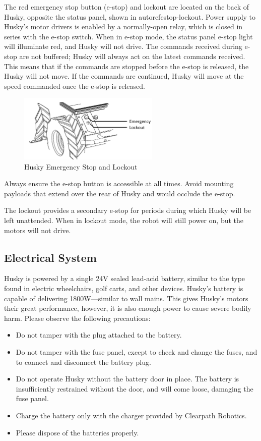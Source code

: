\documentclass[]{clearpath-latex/clearpath-manual}
\begin{document}
The red emergency stop button (e-stop) and lockout are located on the back of Husky, opposite the status panel, 
shown in autoref{estop-lockout}. Power supply to Husky’s motor drivers is enabled by a normally-open relay, 
which is closed in series with the e-stop switch. When in e-stop mode, the status panel e-stop light will illuminate red, 
and Husky will not drive. The commands received during e-stop are not buffered; Husky will always act on the latest commands 
received. This means that if the commands are stopped before the e-stop is released, the Husky will not move. If the 
commands are continued, Husky will move at the speed commanded once the e-stop is released.

\begin{figure}[h]
	\centering
	\includegraphics[width=0.6\textwidth]{estop-lockout.png}
	\caption{Husky Emergency Stop and Lockout}
	\label{estop-lockout}
\end{figure}

Always ensure the e-stop button is accessible at all times. Avoid mounting payloads that extend over the rear of Husky and would occlude the e-stop.

The lockout provides a secondary e-stop for periods during which Husky will be left unattended. When in lockout mode, the robot will still power on, but the motors will not drive.

\subsection{Electrical System}
Husky is powered by a single 24V sealed lead-acid battery, similar to the type found in electric wheelchairs, golf carts, 
and other devices. Husky’s battery is capable of delivering 1800W—similar to wall mains. This gives Husky’s motors their 
great performance, however, it is also enough power to cause severe bodily harm. Please observe the following precautions:

\begin{itemize}
	\item Do not tamper with the plug attached to the battery.
	\item Do not tamper with the fuse panel, except to check and change the fuses, and to connect and disconnect the battery plug.
	\item Do not operate Husky without the battery door in place. The battery is insufficiently restrained without the door, and will come loose, damaging the fuse panel.
	\item Charge the battery only with the charger provided by Clearpath Robotics.
	\item Please dispose of the batteries properly.
\end{itemize}
	
\end{document}
